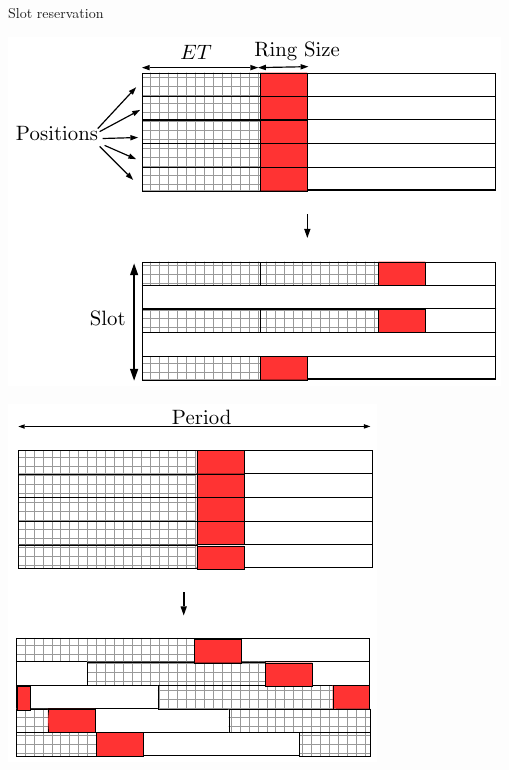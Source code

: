 \documentclass[10 pt]{beamer}
\begin{document}
\begin{frame}{Slot reservation}

     \begin{minipage}[c]{0.4\linewidth}
        \begin{center}
      \includegraphics[scale=0.55]{repart2}
            \vspace{1cm}
          \label{fig:repart1}
      \end{center} 
  \end{minipage}
  \hfill
    \begin{minipage}[c]{0.4\linewidth}
        \begin{center}
      \includegraphics[scale=0.55]{repart1}
      \vspace{1cm}
          \label{fig:repart2}
      \end{center} 
  \end{minipage}
\end{frame}
\end{document}
